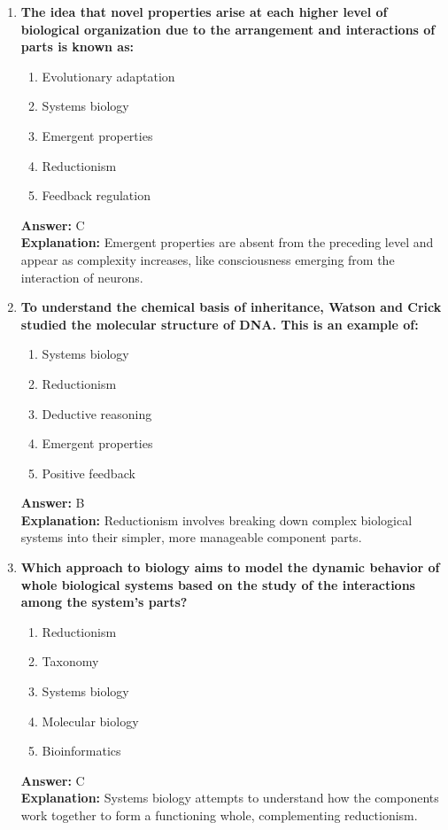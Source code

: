 \documentclass[11pt, a4paper]{article}
\begin{document}
\begin{enumerate}
\item \textbf{The idea that novel properties arise at each higher level of biological organization due to the arrangement and interactions of parts is known as:}
\begin{enumerate}[label=\Alph*.]
    \item Evolutionary adaptation
    \item Systems biology
    \item Emergent properties
    \item Reductionism
    \item Feedback regulation
\end{enumerate}
\textbf{Answer:} C \\
\textbf{Explanation:} Emergent properties are absent from the preceding level and appear as complexity increases, like consciousness emerging from the interaction of neurons.

\item \textbf{To understand the chemical basis of inheritance, Watson and Crick studied the molecular structure of DNA. This is an example of:}
\begin{enumerate}[label=\Alph*.]
    \item Systems biology
    \item Reductionism
    \item Deductive reasoning
    \item Emergent properties
    \item Positive feedback
\end{enumerate}
\textbf{Answer:} B \\
\textbf{Explanation:} Reductionism involves breaking down complex biological systems into their simpler, more manageable component parts.

\item \textbf{Which approach to biology aims to model the dynamic behavior of whole biological systems based on the study of the interactions among the system's parts?}
\begin{enumerate}[label=\Alph*.]
    \item Reductionism
    \item Taxonomy
    \item Systems biology
    \item Molecular biology
    \item Bioinformatics
\end{enumerate}
\textbf{Answer:} C \\
\textbf{Explanation:} Systems biology attempts to understand how the components work together to form a functioning whole, complementing reductionism.


\end{enumerate}
\end{document}
